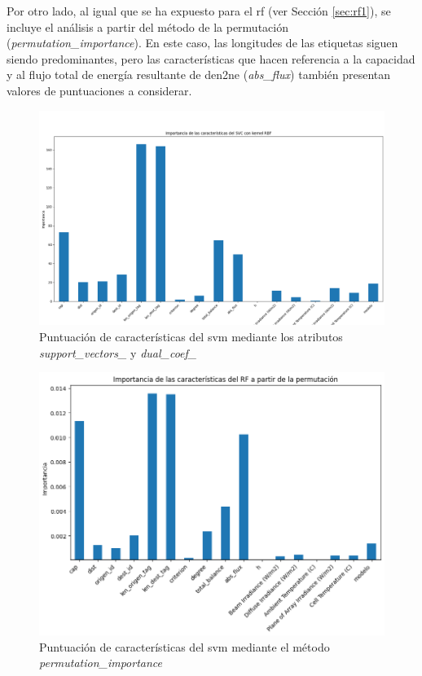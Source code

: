 \vspace{3mm}

Por otro lado, al igual que se ha expuesto para el \gls{rf} (ver Sección \ref{sec:rf1}), se incluye el análisis a partir del método de la permutación (\textit{permutation\_importance}). En este caso, las longitudes de las etiquetas siguen siendo predominantes, pero las características que hacen referencia a la capacidad y al flujo total de energía resultante de \gls{den2ne} (\textit{abs\_flux}) también presentan valores de puntuaciones a considerar.

\begin{figure}[H]
    \centering
    \includegraphics[width=1\textwidth]{img/desarrollo/svm/importance3.png}
    \caption{Puntuación de características del \acrshort{svm} mediante los atributos \textit{support\_vectors\_} y \textit{dual\_coef\_}}
    \label{fig:imp3}
\end{figure}
  
\begin{figure}[H]
    \centering
    \includegraphics[width=1\textwidth]{img/desarrollo/svm/importance4.png}
    \caption{Puntuación de características del \acrshort{svm} mediante el método \textit{permutation\_importance}}
    \label{fig:imp4}
\end{figure}

